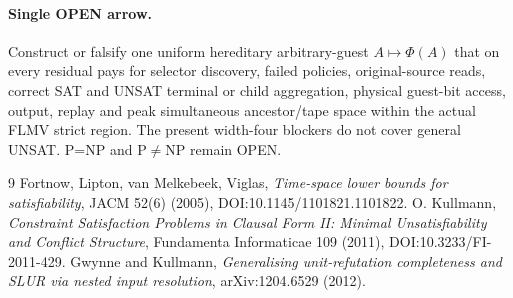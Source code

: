 \documentclass[11pt]{article}
\begin{document}
\paragraph{Single OPEN arrow.} Construct or falsify one uniform hereditary arbitrary-guest $A\mapsto\Phi(A)$ that on every residual pays for selector discovery, failed policies, original-source reads, correct SAT and UNSAT terminal or child aggregation, physical guest-bit access, output, replay and peak simultaneous ancestor/tape space within the actual FLMV strict region. The present width-four blockers do not cover general UNSAT. P=NP and P$\ne$NP remain OPEN.
\begin{thebibliography}{9}
 Fortnow, Lipton, van Melkebeek, Viglas, \emph{Time-space lower bounds for satisfiability}, JACM 52(6) (2005), DOI:10.1145/1101821.1101822.
 O. Kullmann, \emph{Constraint Satisfaction Problems in Clausal Form II: Minimal Unsatisfiability and Conflict Structure}, Fundamenta Informaticae 109 (2011), DOI:10.3233/FI-2011-429.
 Gwynne and Kullmann, \emph{Generalising unit-refutation completeness and SLUR via nested input resolution}, arXiv:1204.6529 (2012).
\end{thebibliography}
\end{document}
